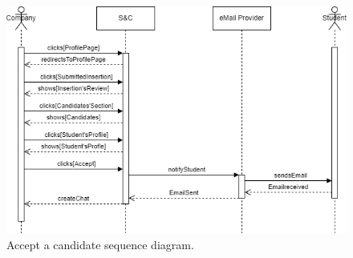\begin{figure}[H]
    \begin{center}
        \includegraphics[width=1\linewidth]{Images/image7.png}
        \caption{Accept a candidate sequence diagram.}
        \label{fig:accept_a_candidate_seqdiag}%
    \end{center}
\end{figure}


